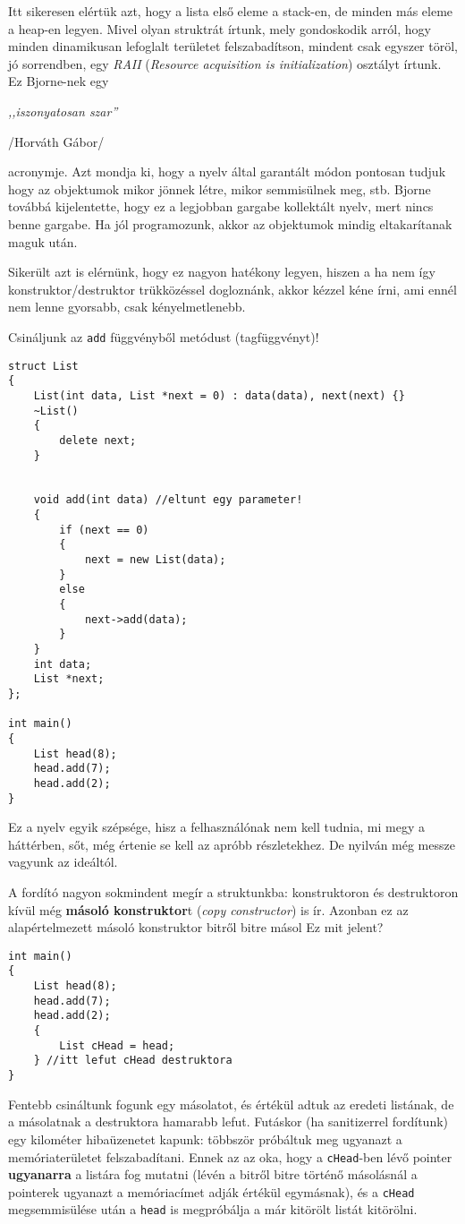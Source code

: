 \documentclass[a4paper,11.5pt]{article}
\begin{document}
	Itt sikeresen elértük azt, hogy a lista első eleme a stack-en, de minden más eleme a heap-en legyen. Mivel olyan struktrát írtunk, mely gondoskodik arról, hogy minden dinamikusan lefoglalt területet felszabadítson, mindent csak egyszer töröl, jó sorrendben, egy  \textit{RAII} (\textit{Resource acquisition is initialization}) osztályt írtunk. Ez Bjorne-nek egy
	\begin{center}
		\textit{,,iszonyatosan szar''}
		
		/Horváth Gábor/
	\end{center}
	acronymje. Azt mondja ki, hogy a nyelv által garantált módon pontosan tudjuk hogy az objektumok mikor jönnek létre, mikor semmisülnek meg, stb. Bjorne továbbá kijelentette, hogy ez a legjobban gargabe kollektált nyelv, mert nincs benne gargabe. Ha jól programozunk, akkor az objektumok mindig eltakarítanak maguk után. 
	
	Sikerült azt is elérnünk, hogy ez nagyon hatékony legyen, hiszen a ha nem így konstruktor/destruktor trükközéssel dogloznánk, akkor kézzel kéne írni, ami ennél nem lenne gyorsabb, csak kényelmetlenebb.
	
	\medskip
	Csináljunk az \texttt{add} függvényből metódust (tagfüggvényt)!
	\begin{lstlisting}
struct List
{
	List(int data, List *next = 0) : data(data), next(next) {}
	~List()
	{
		delete next;
	}
	
	
	void add(int data) //eltunt egy parameter!
	{
		if (next == 0)
		{
			next = new List(data);
		}
		else
		{
			next->add(data);
		}
	}
	int data;
	List *next;
};

int main()
{
	List head(8);
	head.add(7);
	head.add(2);
}
	\end{lstlisting}
	Ez a nyelv egyik szépsége, hisz a felhasználónak nem kell tudnia, mi megy a háttérben, sőt, még értenie se kell az apróbb részletekhez. De nyilván még messze vagyunk az ideáltól.
	\medskip
	
	A fordító nagyon sokmindent megír a struktunkba: konstruktoron és destruktoron kívül még \textbf{másoló konstruktor}t (\textit{copy constructor}) is ír. Azonban ez az alapértelmezett másoló konstruktor bitről bitre másol Ez mit jelent?
	\begin{lstlisting}
int main()
{
	List head(8);
	head.add(7);
	head.add(2);
	{
		List cHead = head;
	} //itt lefut cHead destruktora
}
	\end{lstlisting}
	Fentebb csináltunk fogunk egy másolatot, és értékül adtuk az eredeti listának, de a másolatnak a destruktora hamarabb lefut. Futáskor (ha sanitizerrel fordítunk) egy kilométer hibaüzenetet kapunk: többször próbáltuk meg ugyanazt a memóriaterületet felszabadítani. Ennek az az oka, hogy a \texttt{cHead}-ben lévő pointer \textbf{ugyanarra} a listára fog mutatni (lévén a bitről bitre történő másolásnál a pointerek ugyanazt a memóriacímet adják értékül egymásnak), és a \texttt{cHead} megsemmisülése után a \texttt{head} is megpróbálja a már kitörölt listát kitörölni.
	\medskip
	
\end{document}

